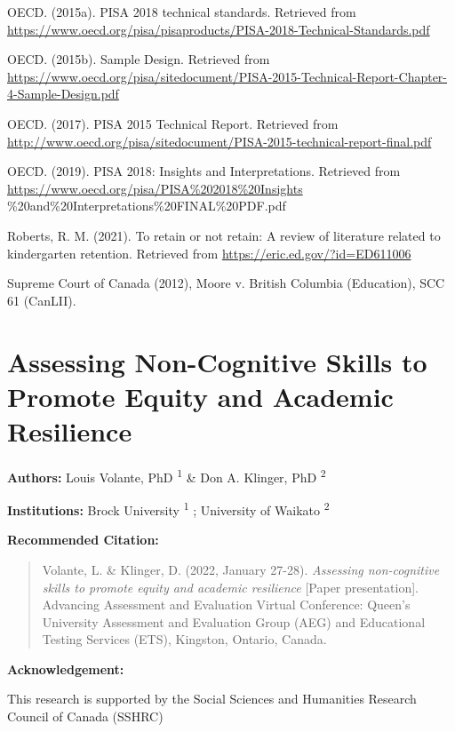 \documentclass[
]{book}
\begin{document}
OECD. (2015a). PISA 2018 technical standards. Retrieved from \url{https://www.oecd.org/pisa/pisaproducts/PISA-2018-Technical-Standards.pdf}

OECD. (2015b). Sample Design. Retrieved from \url{https://www.oecd.org/pisa/sitedocument/PISA-2015-Technical-Report-Chapter-4-Sample-Design.pdf}

OECD. (2017). PISA 2015 Technical Report. Retrieved from \url{http://www.oecd.org/pisa/sitedocument/PISA-2015-technical-report-final.pdf}

OECD. (2019). PISA 2018: Insights and Interpretations. Retrieved from \url{https://www.oecd.org/pisa/PISA\%202018\%20Insights} \%20and\%20Interpretations\%20FINAL\%20PDF.pdf

Roberts, R. M. (2021). To retain or not retain: A review of literature related to kindergarten retention. Retrieved from \url{https://eric.ed.gov/?id=ED611006}

Supreme Court of Canada (2012), Moore v. British Columbia (Education), SCC 61 (CanLII).

\newpage

\hypertarget{assessing-non-cognitive-skills-to-promote-equity-and-academic-resilience}{%
\section{Assessing Non-Cognitive Skills to Promote Equity and Academic Resilience}\label{assessing-non-cognitive-skills-to-promote-equity-and-academic-resilience}}

\textbf{Authors:} Louis Volante, PhD \textsuperscript{1} \& Don A. Klinger, PhD \textsuperscript{2}

\textbf{Institutions:} Brock University \textsuperscript{1} ; University of Waikato \textsuperscript{2}

\textbf{Recommended Citation:}

\begin{quote}
Volante, L. \& Klinger, D. (2022, January 27-28). \emph{Assessing non-cognitive skills to promote equity and academic resilience} {[}Paper presentation{]}. Advancing Assessment and Evaluation Virtual Conference: Queen's University Assessment and Evaluation Group (AEG) and Educational Testing Services (ETS), Kingston, Ontario, Canada.
\end{quote}

\textbf{Acknowledgement:}

This research is supported by the Social Sciences and Humanities Research Council of Canada (SSHRC)
\end{document}
